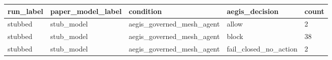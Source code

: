 \begin{tabular}{lllll}
 \hline
run\_label & paper\_model\_label & condition & aegis\_decision & count \\
 \hline
stubbed & stub\_model & aegis\_governed\_mesh\_agent & allow & 2 \\
stubbed & stub\_model & aegis\_governed\_mesh\_agent & block & 38 \\
stubbed & stub\_model & aegis\_governed\_mesh\_agent & fail\_closed\_no\_action & 2 \\
 \hline
\end{tabular}
